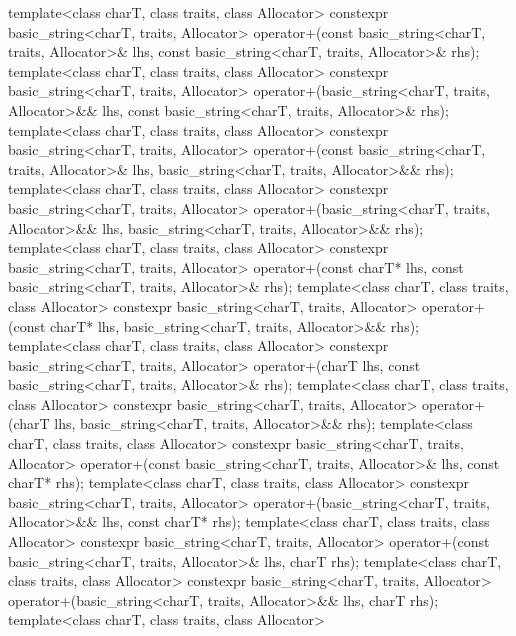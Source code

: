 \begin{codeblock}
{  template<class charT, class traits, class Allocator>
    constexpr basic_string<charT, traits, Allocator>
      operator+(const basic_string<charT, traits, Allocator>& lhs,
                const basic_string<charT, traits, Allocator>& rhs);
  template<class charT, class traits, class Allocator>
    constexpr basic_string<charT, traits, Allocator>
      operator+(basic_string<charT, traits, Allocator>&& lhs,
                const basic_string<charT, traits, Allocator>& rhs);
  template<class charT, class traits, class Allocator>
    constexpr basic_string<charT, traits, Allocator>
      operator+(const basic_string<charT, traits, Allocator>& lhs,
                basic_string<charT, traits, Allocator>&& rhs);
  template<class charT, class traits, class Allocator>
    constexpr basic_string<charT, traits, Allocator>
      operator+(basic_string<charT, traits, Allocator>&& lhs,
                basic_string<charT, traits, Allocator>&& rhs);
  template<class charT, class traits, class Allocator>
    constexpr basic_string<charT, traits, Allocator>
      operator+(const charT* lhs,
                const basic_string<charT, traits, Allocator>& rhs);
  template<class charT, class traits, class Allocator>
    constexpr basic_string<charT, traits, Allocator>
      operator+(const charT* lhs,
                basic_string<charT, traits, Allocator>&& rhs);
  template<class charT, class traits, class Allocator>
    constexpr basic_string<charT, traits, Allocator>
      operator+(charT lhs,
                const basic_string<charT, traits, Allocator>& rhs);
  template<class charT, class traits, class Allocator>
    constexpr basic_string<charT, traits, Allocator>
      operator+(charT lhs,
                basic_string<charT, traits, Allocator>&& rhs);
  template<class charT, class traits, class Allocator>
    constexpr basic_string<charT, traits, Allocator>
      operator+(const basic_string<charT, traits, Allocator>& lhs,
                const charT* rhs);
  template<class charT, class traits, class Allocator>
    constexpr basic_string<charT, traits, Allocator>
      operator+(basic_string<charT, traits, Allocator>&& lhs,
                const charT* rhs);
  template<class charT, class traits, class Allocator>
    constexpr basic_string<charT, traits, Allocator>
      operator+(const basic_string<charT, traits, Allocator>& lhs,
                charT rhs);
  template<class charT, class traits, class Allocator>
    constexpr basic_string<charT, traits, Allocator>
      operator+(basic_string<charT, traits, Allocator>&& lhs,
                charT rhs);
  template<class charT, class traits, class Allocator>
}
\end{codeblock}
